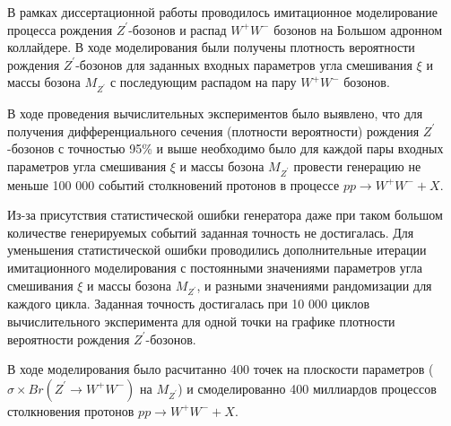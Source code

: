 В рамках диссертационной работы проводилось имитационное моделирование процесса рождения ${Z}^{\prime}$-бозонов и распад ${W}^{+}{W}^{-}$ бозонов на Большом адронном коллайдере. В ходе моделирования были получены плотность вероятности рождения ${Z}^{\prime}$-бозонов для заданных входных параметров угла смешивания $\xi$ и массы бозона ${M}_{{Z}^{\prime}}$ с последующим распадом на пару ${W}^{+}{W}^{-}$ бозонов.

В ходе проведения вычислительных экспериментов было выявлено, что для получения дифференциального сечения (плотности вероятности) рождения ${Z}^{\prime}$-бозонов с точностью 95\% и выше необходимо было для каждой пары входных параметров угла смешивания $\xi$ и массы бозона ${M}_{{Z}^{\prime}}$ провести генерацию не меньше 100 000 событий столкновений протонов в процессе $pp \rightarrow W^+W^- + X$. 

Из-за присутствия статистической ошибки генератора даже при таком большом количестве генерируемых событий заданная точность не достигалась. Для уменьшения статистической ошибки проводились дополнительные итерации имитационного моделирования с постоянными значениями параметров угла смешивания $\xi$ и массы бозона ${M}_{{Z}^{\prime}}$, и разными значениями рандомизации для каждого цикла. Заданная точность достигалась при 10 000 циклов вычислительного эксперимента для одной точки на графике плотности вероятности рождения ${Z}^{\prime}$-бозонов.

В ходе моделирования было расчитанно 400 точек на плоскости параметров ($\sigma \times Br({Z}^{\prime} \rightarrow {W}^{+}{W}^{-})$ на ${M}_{{Z}^{\prime}}$) и смоделированно 400 миллиардов процессов столкновения протонов $pp \rightarrow W^+W^- + X$.